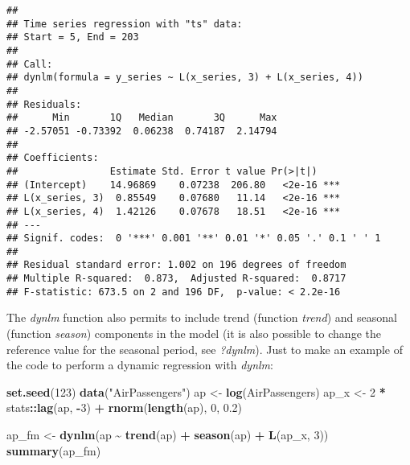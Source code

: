 \documentclass[
]{article}
\newenvironment{Shaded}{\begin{snugshade}}{\end{snugshade}}
\newcommand{\DecValTok}[1]{\textcolor[rgb]{0.00,0.00,0.81}{#1}}
\newcommand{\FloatTok}[1]{\textcolor[rgb]{0.00,0.00,0.81}{#1}}
\newcommand{\FunctionTok}[1]{\textcolor[rgb]{0.13,0.29,0.53}{\textbf{#1}}}
\newcommand{\NormalTok}[1]{#1}
\newcommand{\OtherTok}[1]{\textcolor[rgb]{0.56,0.35,0.01}{#1}}
\newcommand{\SpecialCharTok}[1]{\textcolor[rgb]{0.81,0.36,0.00}{\textbf{#1}}}
\newcommand{\StringTok}[1]{\textcolor[rgb]{0.31,0.60,0.02}{#1}}
\begin{document}
\begin{verbatim}
## 
## Time series regression with "ts" data:
## Start = 5, End = 203
## 
## Call:
## dynlm(formula = y_series ~ L(x_series, 3) + L(x_series, 4))
## 
## Residuals:
##      Min       1Q   Median       3Q      Max 
## -2.57051 -0.73392  0.06238  0.74187  2.14794 
## 
## Coefficients:
##                Estimate Std. Error t value Pr(>|t|)    
## (Intercept)    14.96869    0.07238  206.80   <2e-16 ***
## L(x_series, 3)  0.85549    0.07680   11.14   <2e-16 ***
## L(x_series, 4)  1.42126    0.07678   18.51   <2e-16 ***
## ---
## Signif. codes:  0 '***' 0.001 '**' 0.01 '*' 0.05 '.' 0.1 ' ' 1
## 
## Residual standard error: 1.002 on 196 degrees of freedom
## Multiple R-squared:  0.873,  Adjusted R-squared:  0.8717 
## F-statistic: 673.5 on 2 and 196 DF,  p-value: < 2.2e-16
\end{verbatim}

The \emph{dynlm} function also permits to include trend (function \emph{trend}) and seasonal (function \emph{season}) components in the model (it is also possible to change the reference value for the seasonal period, see \emph{?dynlm}). Just to make an example of the code to perform a dynamic regression with \emph{dynlm}:

\begin{Shaded}
\begin{Highlighting}[]
\FunctionTok{set.seed}\NormalTok{(}\DecValTok{123}\NormalTok{)}
\FunctionTok{data}\NormalTok{(}\StringTok{"AirPassengers"}\NormalTok{)}
\NormalTok{ap }\OtherTok{\textless{}{-}} \FunctionTok{log}\NormalTok{(AirPassengers)}
\NormalTok{ap\_x }\OtherTok{\textless{}{-}} \DecValTok{2} \SpecialCharTok{*}\NormalTok{ stats}\SpecialCharTok{::}\FunctionTok{lag}\NormalTok{(ap, }\SpecialCharTok{{-}}\DecValTok{3}\NormalTok{) }\SpecialCharTok{+} \FunctionTok{rnorm}\NormalTok{(}\FunctionTok{length}\NormalTok{(ap), }\DecValTok{0}\NormalTok{, }\FloatTok{0.2}\NormalTok{)}

\NormalTok{ap\_fm }\OtherTok{\textless{}{-}} \FunctionTok{dynlm}\NormalTok{(ap }\SpecialCharTok{\textasciitilde{}} \FunctionTok{trend}\NormalTok{(ap) }\SpecialCharTok{+} \FunctionTok{season}\NormalTok{(ap) }\SpecialCharTok{+} \FunctionTok{L}\NormalTok{(ap\_x, }\DecValTok{3}\NormalTok{))}
\FunctionTok{summary}\NormalTok{(ap\_fm)}
\end{Highlighting}
\end{Shaded}
\end{document}

